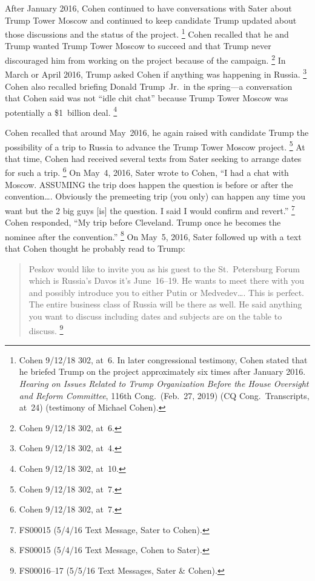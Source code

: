 After January 2016, Cohen continued to have conversations with Sater about Trump Tower Moscow and continued to keep candidate Trump updated about those discussions and the status of the project.%
\footnote{Cohen 9/12/18 302, at~6.
In later congressional testimony, Cohen stated that he briefed Trump on the project approximately six times after January 2016.
\textit{Hearing on Issues Related to Trump Organization Before the House Oversight and Reform Committee}, 116th Cong.\ (Feb.~27, 2019) (CQ Cong.\ Transcripts, at~24) (testimony of Michael Cohen).}
Cohen recalled that he and Trump wanted Trump Tower Moscow to succeed and that Trump never discouraged him from working on the project because of the campaign.%
\footnote{Cohen 9/12/18 302, at~6.}
In March or April 2016, Trump asked Cohen if anything was happening in Russia.%
\footnote{Cohen 9/12/18 302, at~4.}
Cohen also recalled briefing Donald Trump~Jr.\ in the spring---a conversation that Cohen said was not ``idle chit chat'' because Trump Tower Moscow was potentially a \$1~billion deal.%
\footnote{Cohen 9/12/18 302, at~10.}

Cohen recalled that around May~2016, he again raised with candidate Trump the possibility of a trip to Russia to advance the Trump Tower Moscow project.%
\footnote{Cohen 9/12/18 302, at~7.}
At that time, Cohen had received several texts from Sater seeking to arrange dates for such a trip.%
\footnote{Cohen 9/12/18 302, at~7.}
On May~4, 2016, Sater wrote to Cohen, ``I had a chat with Moscow.
ASSUMING the trip does happen the question is before or after the convention\dots.
Obviously the premeeting trip (you only) can happen any time you want but the 2 big guys [is] the question.
I said I would confirm and revert.''%
\footnote{FS00015 (5/4/16 Text Message, Sater to Cohen).}
Cohen responded, ``My trip before Cleveland.
Trump once he becomes the nominee after the convention.''%
\footnote{FS00015 (5/4/16 Text Message, Cohen to Sater).}
On May~5, 2016, Sater followed up with a text that Cohen thought he probably read to Trump:

\begin{quote}
Peskov would like to invite you as his guest to the St.~Petersburg Forum which is Russia's Davos it's June~16--19.
He wants to meet there with you and possibly introduce you to either Putin or Medvedev\dots.
This is perfect.
The entire business class of Russia will be there as well.
He said anything you want to discuss including dates and subjects are on the table to discuss.%
\footnote{FS00016--17 (5/5/16 Text Messages, Sater \& Cohen).}
\end{quote}

